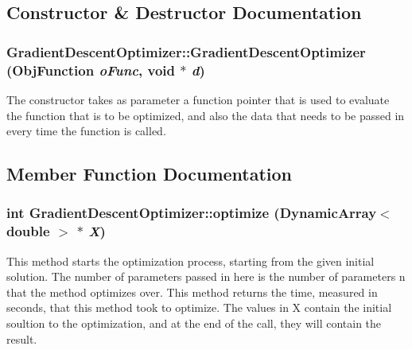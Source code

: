 \subsection{Constructor \& Destructor Documentation}
\hypertarget{classCartWheel_1_1Util_1_1GradientDescentOptimizer_a3bcbf1e0037c3a54dc6653d4bae547b6}{
\subsubsection[{GradientDescentOptimizer}]{\setlength{\rightskip}{0pt plus 5cm}GradientDescentOptimizer::GradientDescentOptimizer (ObjFunction {\em oFunc}, \/  void $\ast$ {\em d})}}
\label{classCartWheel_1_1Util_1_1GradientDescentOptimizer_a3bcbf1e0037c3a54dc6653d4bae547b6}
The constructor takes as parameter a function pointer that is used to evaluate the function that is to be optimized, and also the data that needs to be passed in every time the function is called. 

\subsection{Member Function Documentation}
\hypertarget{classCartWheel_1_1Util_1_1GradientDescentOptimizer_aa66e5068f2ba79bbc2e85ec24cac8631}{
\subsubsection[{optimize}]{\setlength{\rightskip}{0pt plus 5cm}int GradientDescentOptimizer::optimize (DynamicArray$<$ double $>$ $\ast$ {\em X})}}
\label{classCartWheel_1_1Util_1_1GradientDescentOptimizer_aa66e5068f2ba79bbc2e85ec24cac8631}
This method starts the optimization process, starting from the given initial solution. The number of parameters passed in here is the number of parameters n that the method optimizes over. This method returns the time, measured in seconds, that this method took to optimize. The values in X contain the initial soultion to the optimization, and at the end of the call, they will contain the result.

